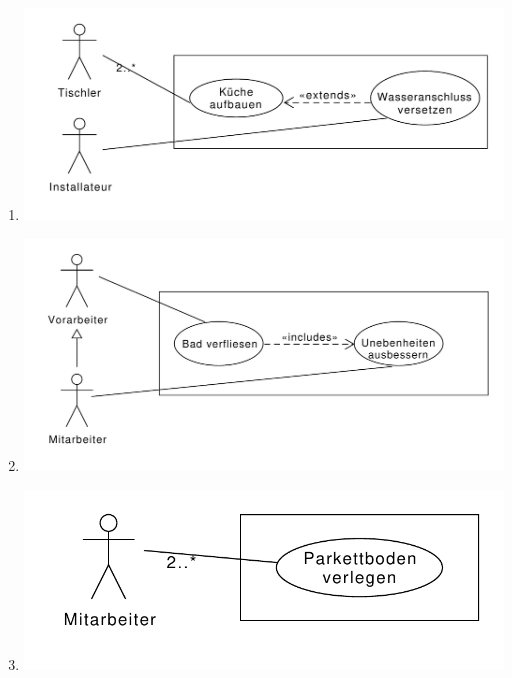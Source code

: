 \documentclass[a4paper, 12pt, margins=2.5cm]{homework}
\begin{document}
  
  \begin{problem}
    
  \end{problem}
  \begin{solution}\hfill
    \begin{enumerate}[label=\alph*)]\itemsep0pt
      \item \hfill
        \begin{center}
          \includegraphics[scale=0.5]{Aufgabe4a.pdf}
        \end{center}

      \item \hfill
        \begin{center}
          \includegraphics[scale=0.5]{Aufgabe4b.pdf}
        \end{center}

      \item \hfill
        \begin{center}
          \includegraphics[scale=0.5]{Aufgabe4c.pdf}
        \end{center}
    \end{enumerate}
  \end{solution}
  
\end{document}

